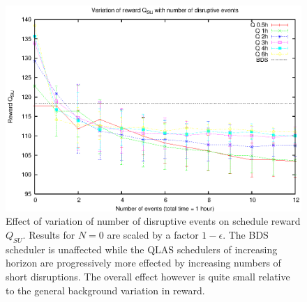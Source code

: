 \begin{figure}[h]
\begin{center}
 \includegraphics[scale=1.0, angle=0]{figures/disruption.eps}
 \caption[Effect of variation of number of disruptive events $N$ on total schedule reward $Q_{SU}$.] 
   {Effect of variation of number of disruptive events on schedule reward $Q_{SU}$. Results for $N = 0$ are scaled by a factor $1-\epsilon$. The BDS scheduler is unaffected while the QLAS schedulers of increasing horizon are progressively more effected by increasing numbers of short disruptions. The overall effect however is quite small relative to the general background  variation in reward.}
\label{fig:disrupt}
\end{center}
\end{figure}
